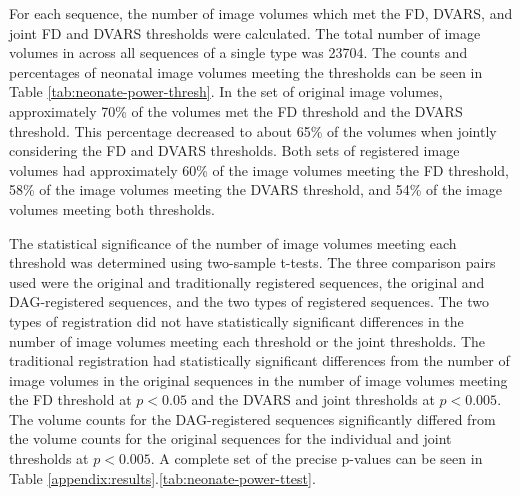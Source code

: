 For each sequence, the number of image volumes which met the FD, DVARS, and joint FD and DVARS thresholds were calculated. The total number of image volumes in across all sequences of a single type was 23704. The counts and percentages of neonatal image volumes meeting the thresholds can be seen in Table \ref{tab:neonate-power-thresh}. In the set of original image volumes, approximately 70\% of the volumes met the FD threshold and the DVARS threshold. This percentage decreased to about 65\% of the volumes when jointly considering the FD and DVARS thresholds. Both sets of registered image volumes had approximately 60\% of the image volumes meeting the FD threshold, 58\% of the image volumes meeting the DVARS threshold, and 54\% of the image volumes meeting both thresholds.

The statistical significance of the number of image volumes meeting each threshold was determined using two-sample t-tests. The three comparison pairs used were the original and traditionally registered sequences, the original and DAG-registered sequences, and the two types of registered sequences. The two types of registration did not have statistically significant differences in the number of image volumes meeting each threshold or the joint thresholds. The traditional registration had statistically significant differences from the number of image volumes in the original sequences in the number of image volumes meeting the FD threshold at $p < 0.05$ and the DVARS and joint thresholds at $p < 0.005$. The volume counts for the DAG-registered sequences significantly differed from the volume counts for the original sequences for the individual and joint thresholds at $p < 0.005$. A complete set of the precise p-values can be seen in Table \ref{appendix:results}.\ref{tab:neonate-power-ttest}.

